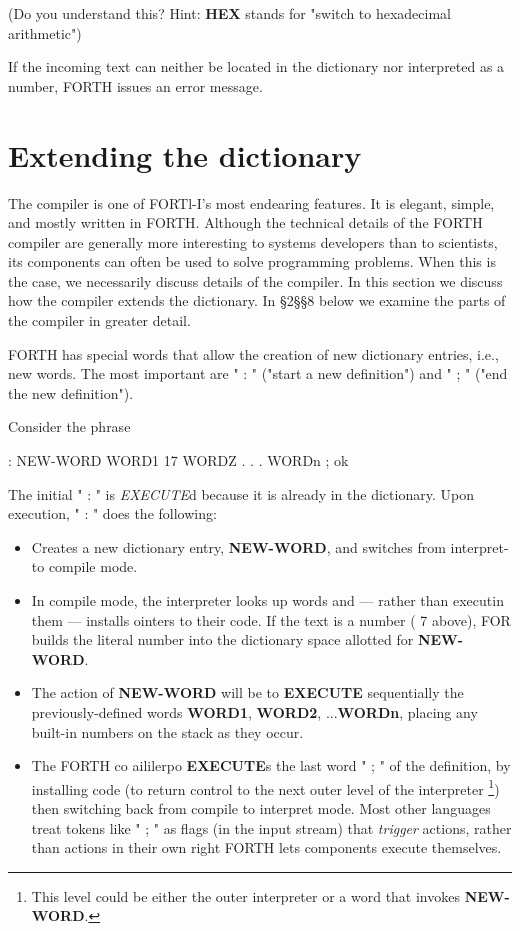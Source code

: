 (Do you understand this? Hint: \textbf{HEX} stands for "switch to hexadecimal arithmetic")

If the incoming text can neither be located in the dictionary nor interpreted as a number, FORTH issues an error message.


\section{Extending the dictionary}

The compiler is one of FORTl-I’s most endearing features. It is elegant, simple, and mostly written in FORTH. Although the technical details of the FORTH compiler are generally more interesting to systems developers than to scientists, its components can often be used to solve programming problems. When this is the case, we necessarily discuss details of the compiler. In this section we discuss how the compiler extends the dictionary. In §2§§8 below we examine the parts of the compiler in greater detail.

FORTH has special words that allow the creation of new dictionary entries, i.e., new words. The most important are " : " ("start a new definition") and " ; " ("end the new definition").

Consider the phrase

: NEW-WORD WORD1 17 WORDZ . . . WORDn ; ok

The initial " : " is \textit{EXECUTE}d because it is already in the dictionary. Upon execution, " : " does the following:

\begin{itemize}
    \item Creates a new dictionary entry, \textbf{NEW-WORD}, and switches from interpret- to compile mode.
    \item In compile mode, the interpreter looks up words and — rather than executin them — installs ointers to their code. If the text is a number ( 7 above), FOR builds the literal number into
the dictionary space allotted for \textbf{NEW-WORD}.
    \item The action of \textbf{NEW-WORD} will be to \textbf{EXECUTE} sequentially the previously-defined words \textbf{WORD1}, \textbf{WORD2}, ...\textbf{WORDn}, placing any built-in numbers on the stack as they occur.
    \item The FORTH co aililerpo \textbf{EXECUTE}s the last word " ; " of the definition, by installing code (to return control to the next outer level of the interpreter \footnote{This level could be either the outer interpreter or a word that invokes \textbf{ NEW-WORD}.}) then switching back from compile to interpret mode. Most other languages treat tokens like " ; " as ﬂags (in the input stream) that \textit{trigger} actions, rather than actions in their own right FORTH lets components execute themselves.
\end{itemize}

